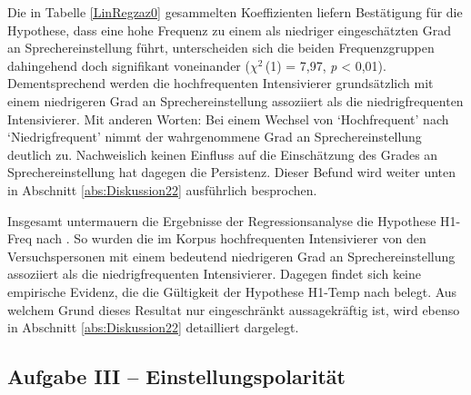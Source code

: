 \noindent Die in Tabelle \ref{LinRegzaz0} gesammelten Koeffizienten liefern Bestätigung für die Hypothese, dass eine hohe Frequenz zu einem als niedriger eingeschätzten Grad an Sprechereinstellung führt, unterscheiden sich die beiden Frequenzgruppen dahingehend doch signifikant voneinander ({$\chi$$^{2}$\,(1) = 7,97}, \textit{p} < 0,01). Dementsprechend werden die hochfrequenten Intensivierer grundsätzlich mit einem niedrigeren Grad an Sprechereinstellung assoziiert als die niedrigfrequenten Intensivierer. Mit anderen Worten: Bei einem Wechsel von `Hochfrequent' nach `Niedrigfrequent' nimmt der wahrgenommene Grad an Sprechereinstellung deutlich zu. Nachweislich keinen Einfluss auf die Einschätzung des Grades an Sprechereinstellung hat dagegen die Persistenz. Dieser Befund wird weiter unten in {Abschnitt \ref{abs:Diskussion22}} ausführlich besprochen.


Insgesamt untermauern die Ergebnisse der Regressionsanalyse die {Hypothese H1-Freq} nach \citet[2]{Hauschild.1899}. So wurden die im Korpus hochfrequenten Intensivierer von den Versuchspersonen mit einem bedeutend niedrigeren Grad an Sprechereinstellung assoziiert als die niedrigfrequenten Intensivierer. Dagegen findet sich keine empirische Evidenz, die die Gültigkeit der Hypothese H1-Temp nach \citet[59]{Tobler.1868} belegt. Aus welchem Grund dieses Resultat nur eingeschränkt aussagekräftig ist, wird ebenso in {Abschnitt \ref{abs:Diskussion22}} detailliert dargelegt.






\subsection{Aufgabe III -- Einstellungspolarität} \label{abs:Ev-Vergleich}






